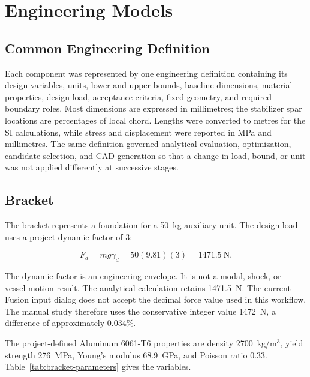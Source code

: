 \section{Engineering Models}
\label{sec:engineering-models}

\subsection{Common Engineering Definition}
\label{sec:part-definition}

Each component was represented by one engineering definition containing its
design variables, units, lower and upper bounds, baseline dimensions, material
properties, design load, acceptance criteria, fixed geometry, and required
boundary roles. Most dimensions are expressed in millimetres; the stabilizer
spar locations are percentages of local chord. Lengths were converted to
metres for the SI calculations, while stress and displacement were reported in
MPa and millimetres. The same definition governed analytical evaluation,
optimization, candidate selection, and CAD generation so that a change in
load, bound, or unit was not applied differently at successive stages.

\subsection{Bracket}
\label{sec:bracket-definition}

The bracket represents a foundation for a 50~kg auxiliary unit. The design
load uses a project dynamic factor of 3:

\begin{equation}
F_d=mg\gamma_d=50(9.81)(3)=1471.5~\mathrm{N}.
\label{eq:bracket-load}
\end{equation}

The dynamic factor is an engineering envelope. It is not a modal, shock, or
vessel-motion result. The analytical calculation retains 1471.5~N. The current
Fusion input dialog does not accept the decimal force value used in this
workflow. The manual study therefore uses the conservative integer value
1472~N, a difference of approximately 0.034\%.

The project-defined Aluminum 6061-T6 properties are density
2700~kg/m$^3$, yield strength 276~MPa, Young's modulus 68.9~GPa, and
Poisson ratio 0.33. Table~\ref{tab:bracket-parameters} gives the variables.

